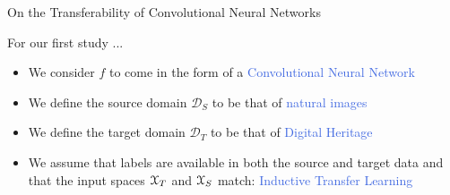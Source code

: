 \documentclass{beamer}
\begin{document}
\begin{frame}{On the Transferability of Convolutional Neural Networks}

	For our first study ...
	\bigskip
	\begin{itemize}
		\item We consider $f$ to come in the form of a \textcolor{RoyalBlue}{Convolutional Neural Network}
		\item We define the source domain $\mathcal{D}_S$ to be that of \textcolor{RoyalBlue}{natural images}
		\item We define the target domain $\mathcal{D}_T$ to be that of \textcolor{RoyalBlue}{Digital Heritage}
		\item We assume that labels are available in both the source and target data and that the input spaces ${\cal X}_T$ and ${\cal X}_S$ match: \textcolor{RoyalBlue}{Inductive Transfer Learning}
	\end{itemize}

\end{frame}
\end{document}
